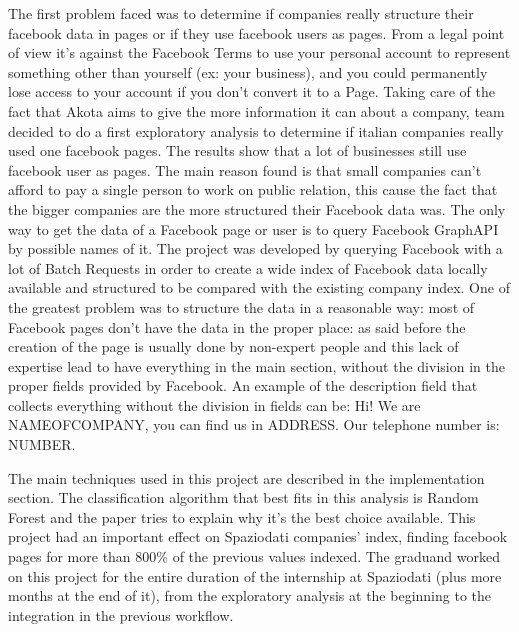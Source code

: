 The first problem faced was to determine if companies really structure their facebook data in pages or if they use facebook users as pages. 
From a legal point of view it's against the Facebook Terms to use your personal account to represent something other than yourself (ex: your business), and you could permanently lose access to your account if you don't convert it to a Page. Taking care of the fact that Akota aims to give the more information it can about a company, team decided to do a first exploratory analysis to determine if italian companies really used one facebook pages. The results show that a lot of businesses still use facebook user as pages. The main reason found is that small companies can't afford to pay a single person to work on public relation, this cause the fact that the bigger companies are the more structured their Facebook data was.
\cite{facebooksum}
The only way to get the data of a Facebook page or user is to query Facebook GraphAPI\cite{graphapi} by possible names of it. The project was developed by querying Facebook with a lot of Batch Requests in order to create a wide index of Facebook data locally available and structured to be compared with the existing company index. One of the greatest problem was to structure the data in a reasonable way: most of Facebook pages don't have the data in the proper place: as said before the creation of the page is usually done by non-expert people and this lack of expertise lead to have everything in the main section, without the division in the proper fields provided by Facebook.
An example of the description field that collects everything without the division in fields can be:
Hi! We are NAMEOFCOMPANY, you can find us in ADDRESS. Our telephone number is: NUMBER.


The main techniques used in this project are described in the implementation section.
The classification algorithm that best fits in this analysis is Random Forest and the paper tries to explain why it's the best choice available.
This project had an important effect on Spaziodati companies' index, finding facebook pages for more than 800\% of the previous values indexed.
The graduand worked on this project for the entire duration of the internship at Spaziodati (plus more months at the end of it), from the exploratory analysis at the beginning to the integration in the previous workflow.
%
%




